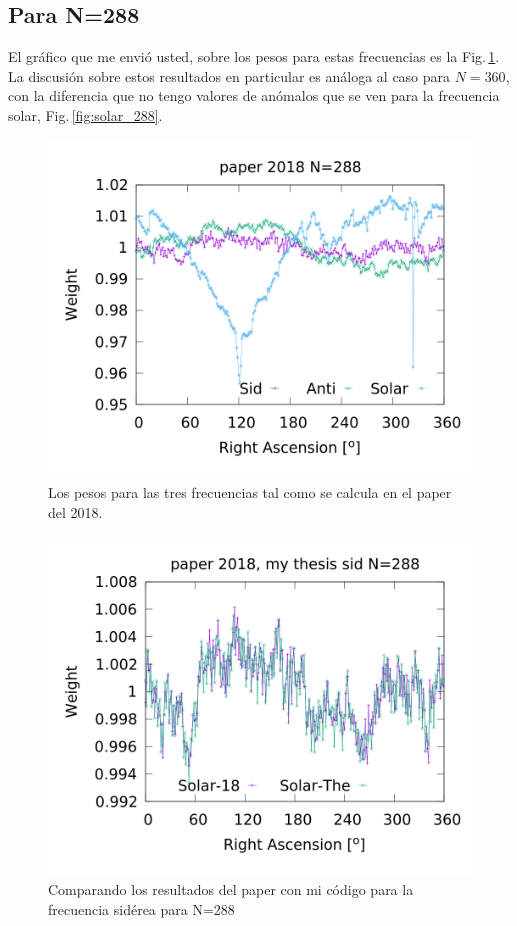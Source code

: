 	\subsection{Para N=288}

	El gráfico que me envió usted, sobre los pesos para estas frecuencias es la Fig.\,\ref{fig:all_288_paper}. La discusión sobre estos resultados en particular es análoga al caso para $N=360$, con la diferencia que no tengo valores de anómalos que se ven para la frecuencia solar, Fig.\,\ref{fig:solar_288}.
	\begin{figure}[H]
	\centering
	\includegraphics[width=0.8\linewidth]{Graficos/solar_anti_sid_paper2018_in_288.png}
	\caption{Los pesos para las tres frecuencias tal como se calcula en el paper del 2018.}
	\label{fig:all_288_paper}
	\end{figure}


	\begin{figure}[H]
	\centering
	\includegraphics[width=0.8\linewidth]{Graficos/sidereal_my_and_paper_in_288.png}
	\caption{Comparando los resultados del paper con mi código para la frecuencia sidérea para N=288}
	\label{fig:sidereal_288}
	\end{figure}


